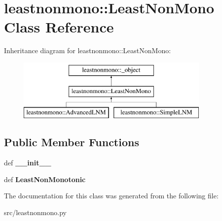 \hypertarget{classleastnonmono_1_1LeastNonMono}{
\section{leastnonmono::LeastNonMono Class Reference}
\label{da/d81/classleastnonmono_1_1LeastNonMono}
}
Inheritance diagram for leastnonmono::LeastNonMono:\begin{figure}[H]
\begin{center}
\leavevmode
\includegraphics[height=3cm]{da/d81/classleastnonmono_1_1LeastNonMono}
\end{center}
\end{figure}
\subsection*{Public Member Functions}
\begin{DoxyCompactItemize}
\item 
\hypertarget{classleastnonmono_1_1LeastNonMono_ad27a656979919a3cf13907470b53fc2d}{
def {\bfseries \_\-\_\-init\_\-\_\-}}
\label{da/d81/classleastnonmono_1_1LeastNonMono_ad27a656979919a3cf13907470b53fc2d}

\item 
\hypertarget{classleastnonmono_1_1LeastNonMono_ab1899f44db61835de8d8f819a07bf07d}{
def {\bfseries LeastNonMonotonic}}
\label{da/d81/classleastnonmono_1_1LeastNonMono_ab1899f44db61835de8d8f819a07bf07d}

\end{DoxyCompactItemize}


The documentation for this class was generated from the following file:\begin{DoxyCompactItemize}
\item 
src/leastnonmono.py\end{DoxyCompactItemize}
